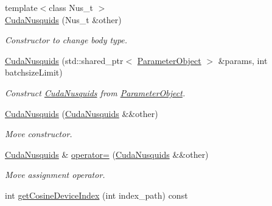 \begin{DoxyCompactItemize}
\item 
{\footnotesize template$<$class Nus\+\_\+t $>$ }\\\hyperlink{classcudanusquids_1_1CudaNusquids_a67201994f00eba7e8c24aca9ff64ecce}{Cuda\+Nusquids} (Nus\+\_\+t \&other)
\begin{DoxyCompactList}\small\item\em Constructor to change body type. \end{DoxyCompactList}\item 
\hyperlink{classcudanusquids_1_1CudaNusquids_a1df9cd5fddc4cde9d8056a10348187f7}{Cuda\+Nusquids} (std\+::shared\+\_\+ptr$<$ \hyperlink{structcudanusquids_1_1ParameterObject}{Parameter\+Object} $>$ \&params, int batchsize\+Limit)
\begin{DoxyCompactList}\small\item\em Construct \hyperlink{classcudanusquids_1_1CudaNusquids}{Cuda\+Nusquids} from \hyperlink{structcudanusquids_1_1ParameterObject}{Parameter\+Object}. \end{DoxyCompactList}\item 
\hyperlink{classcudanusquids_1_1CudaNusquids_a20413f2051b3fb2670128db9eff40af7}{Cuda\+Nusquids} (\hyperlink{classcudanusquids_1_1CudaNusquids}{Cuda\+Nusquids} \&\&other)\hypertarget{classcudanusquids_1_1CudaNusquids_a20413f2051b3fb2670128db9eff40af7}{}\label{classcudanusquids_1_1CudaNusquids_a20413f2051b3fb2670128db9eff40af7}

\begin{DoxyCompactList}\small\item\em Move constructor. \end{DoxyCompactList}\item 
\hyperlink{classcudanusquids_1_1CudaNusquids}{Cuda\+Nusquids} \& \hyperlink{classcudanusquids_1_1CudaNusquids_ab08484f65f87982f0071071783b6ce53}{operator=} (\hyperlink{classcudanusquids_1_1CudaNusquids}{Cuda\+Nusquids} \&\&other)\hypertarget{classcudanusquids_1_1CudaNusquids_ab08484f65f87982f0071071783b6ce53}{}\label{classcudanusquids_1_1CudaNusquids_ab08484f65f87982f0071071783b6ce53}

\begin{DoxyCompactList}\small\item\em Move assignment operator. \end{DoxyCompactList}\item 
int \hyperlink{classcudanusquids_1_1CudaNusquids_a359dfdc3c50c1c193f1a9ead01b7e5fb}{get\+Cosine\+Device\+Index} (int index\+\_\+path) const \hypertarget{classcudanusquids_1_1CudaNusquids_a359dfdc3c50c1c193f1a9ead01b7e5fb}{}\label{classcudanusquids_1_1CudaNusquids_a359dfdc3c50c1c193f1a9ead01b7e5fb}


\end{DoxyCompactItemize}
